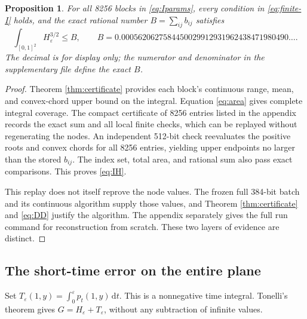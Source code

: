 \documentclass[11pt,a4paper]{article}
\newtheorem{proposition}[theorem]{Proposition}
\theoremstyle{definition}\newtheorem{definition}[theorem]{Definition}
\theoremstyle{remark}\newtheorem{remark}[theorem]{Remark}
\newcommand{\dd}{\,\mathrm d}
\begin{document}
\begin{proposition}\label{prop:IH}
For all 8256 blocks in \eqref{eq:Iparams}, every condition in \eqref{eq:finite-I} holds, and the exact rational number
$B=\sum_{ij}b_{ij}$ satisfies
\begin{equation}\label{eq:IH}
 \int_{[0,1]^2}H_\varepsilon^{3/2}\le B,
 \qquad B=0.0005620627584450029912931962438471980490\ldots.
\end{equation}
The decimal is for display only; the numerator and denominator in the supplementary file define the exact $B$.
\end{proposition}
\begin{proof}
Theorem \ref{thm:certificate} provides each block's continuous range, mean, and convex-chord upper bound on the integral. Equation \eqref{eq:area} gives complete integral coverage. The compact certificate of 8256 entries listed in the appendix records the exact sum and all local finite checks, which can be replayed without regenerating the nodes. An independent 512-bit check reevaluates the positive roots and convex chords for all 8256 entries, yielding upper endpoints no larger than the stored $b_{ij}$. The index set, total area, and rational sum also pass exact comparisons. This proves \eqref{eq:IH}.

This replay does not itself reprove the node values. The frozen full 384-bit batch and its continuous algorithm supply those values, and Theorem \ref{thm:certificate} and \eqref{eq:DD} justify the algorithm. The appendix separately gives the full run command for reconstruction from scratch. These two layers of evidence are distinct.
\end{proof}

\subsection{The short-time error on the entire plane}
Set $T_\varepsilon(1,y)=\int_0^\varepsilon p_t(1,y)\dd t$. This is a nonnegative time integral. Tonelli's theorem gives $G=H_\varepsilon+T_\varepsilon$, without any subtraction of infinite values.
\end{document}
